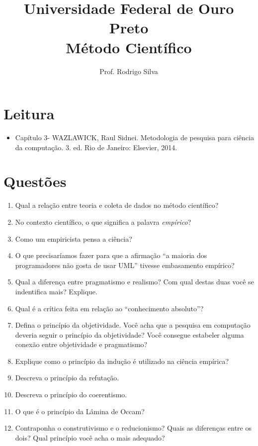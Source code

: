 \documentclass{article}
\title{\vspace{-2 cm}Universidade Federal de Ouro Preto \\  Método Científico}
\author{Prof. Rodrigo Silva}
\date{}
\begin{document}
\maketitle

\section{Leitura}

\begin{itemize}
    \item Capítulo 3- WAZLAWICK, Raul Sidnei. Metodologia de pesquisa para ciência da computação. 3. ed. Rio de Janeiro: Elsevier, 2014.
\end{itemize}

\section{Questões}

\begin{enumerate}
\item Qual a relação entre teoria e coleta de dados no método científico?
\item No contexto científico, o que significa a palavra \textit{empírico}?
\item Como um empiricista pensa a ciência? 
\item O que precisaríamos fazer para que a afirmação ``a maioria dos programadores não gosta de usar UML'' tivesse embasamento empírico?
\item Qual a diferença entre pragmatismo e realismo? Com qual destas duas você se indentifica mais? Explique.
\item Qual é a crítica feita em relação ao ``conhecimento absoluto''?
\item Defina o princípio da objetividade. Você acha que a pesquisa em computação deveria seguir o princípio da objetividade? Você consegue estabeler alguma conexão entre objetividade e pragmatismo?
\item Explique como o princípio da indução é utilizado na ciência empírica?
\item Descreva o princípio da refutação.
\item Descreva o princípio do coerentismo.
\item O que é o princípio da Lâmina de Occam?
\item Contraponha o construtivismo e o reducionismo? Quais as diferenças entre os dois? Qual princípio você acha o mais adequado?
\end{enumerate}


%
%
\end{document}
